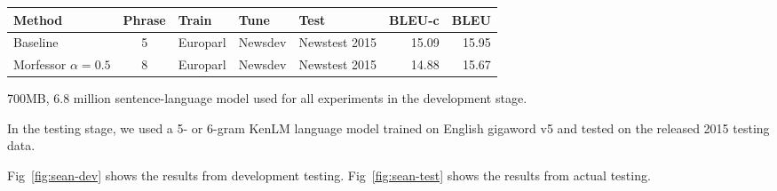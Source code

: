 \begin{figure*}
    \begin{center}
        \begin{tabular}{lclllrr}
            \hline
            \textbf{Method} & \textbf{Phrase} & \textbf{Train} & \textbf{Tune} &
            \textbf{Test} & \textbf{BLEU-c} & \textbf{BLEU} \\
            \hline
            Baseline & 5 & Europarl & Newsdev & Newstest 2015 &
            15.09 & 15.95 \\
            Morfessor $\alpha=0.5$ & 8 & Europarl & Newsdev & Newstest 2015 &
            14.88 & 15.67 \\
            \hline
        \end{tabular}
    \caption{Results from the testing stage with Newstest2015 testing data.}
    \label{fig:sean-test}
    \end{center}
\end{figure*}

700MB, 6.8 million sentence-language model used for all experiments in the
development stage.

In the testing stage, we used a 5- or 6-gram KenLM language model trained on
English gigaword v5 and tested on the released 2015 testing data.

Fig~\ref{fig:sean-dev} shows the results from development testing.
Fig~\ref{fig:sean-test} shows the results from actual testing.
